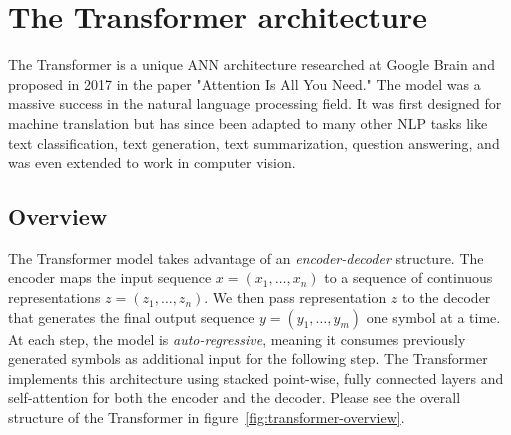 \chapter{The Transformer architecture}\label{ch:transformer-architecture}

\begin{chapterabstract}
    The Transformer is a unique ANN architecture researched at Google Brain and proposed in 2017 in the paper "Attention Is All You Need\cite{attention-is-all-you-need}."
    The model was a massive success in the natural language processing field.
    It was first designed for machine translation but has since been adapted to many other NLP tasks like text classification, text generation\cite{gpt1, gpt2, gpt3}, text summarization, question answering, and was even extended to work in computer vision\cite{dert, vision-transformer, image-transformer}.
\end{chapterabstract}


\section{Overview}\label{sec:overview}

The Transformer model takes advantage of an \textit{encoder-decoder} structure.
The encoder maps the input sequence $x = (x_1, \ldots, x_n)$ to a sequence of continuous representations $z = (z_1, \ldots, z_n)$.
We then pass representation $z$ to the decoder that generates the final output sequence $y = (y_1, \ldots, y_m)$ one symbol at a time.
At each step, the model is \textit{auto-regressive}, meaning it consumes previously generated symbols as additional input for the following step.
The Transformer implements this architecture using stacked point-wise, fully connected layers and self-attention for both the encoder and the decoder.
Please see the overall structure of the Transformer in figure~\ref{fig:transformer-overview}.~\cite{attention-is-all-you-need}


